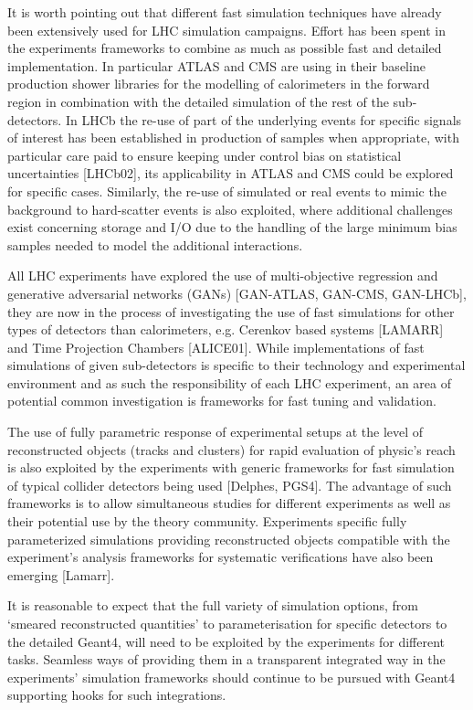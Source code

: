 \documentclass[11pt,a4paper]{article}
\begin{document}
It is worth pointing out that different fast simulation techniques have
already been extensively used for LHC simulation campaigns. Effort has
been spent in the experiments frameworks to combine as much as possible
fast and detailed implementation. In particular ATLAS and CMS are using
in their baseline production shower libraries for the modelling of
calorimeters in the forward region in combination with the detailed
simulation of the rest of the sub-detectors. In LHCb the re-use of part
of the underlying events for specific signals of interest has been
established in production of samples when appropriate, with particular
care paid to ensure keeping under control bias on statistical
uncertainties {[}LHCb02{]}, its applicability in ATLAS and CMS could be
explored for specific cases. Similarly, the re-use of simulated or real
events to mimic the background to hard-scatter events is also exploited,
where additional challenges exist concerning storage and I/O due to the
handling of the large minimum bias samples needed to model the
additional interactions.

All LHC experiments have explored the use of multi-objective regression
and generative adversarial networks (GANs) {[}GAN-ATLAS, GAN-CMS,
GAN-LHCb{]}, they are now in the process of investigating the use of
fast simulations for other types of detectors than calorimeters, e.g.
Cerenkov based systems {[}LAMARR{]} and Time Projection Chambers
{[}ALICE01{]}. While implementations of fast simulations of given
sub-detectors is specific to their technology and experimental
environment and as such the responsibility of each LHC experiment, an
area of potential common investigation is frameworks for fast tuning and
validation.

The use of fully parametric response of experimental setups at the level
of reconstructed objects (tracks and clusters) for rapid evaluation of
physic's reach is also exploited by the experiments with generic
frameworks for fast simulation of typical collider detectors being used
{[}Delphes, PGS4{]}. The advantage of such frameworks is to allow
simultaneous studies for different experiments as well as their
potential use by the theory community. Experiments specific fully
parameterized simulations providing reconstructed objects compatible
with the experiment's analysis frameworks for systematic verifications
have also been emerging {[}Lamarr{]}.

It is reasonable to expect that the full variety of simulation options,
from `smeared reconstructed quantities' to parameterisation for specific
detectors to the detailed Geant4, will need to be exploited by the
experiments for different tasks. Seamless ways of providing them in a
transparent integrated way in the experiments' simulation frameworks
should continue to be pursued with Geant4 supporting hooks for such
integrations.
\end{document}
